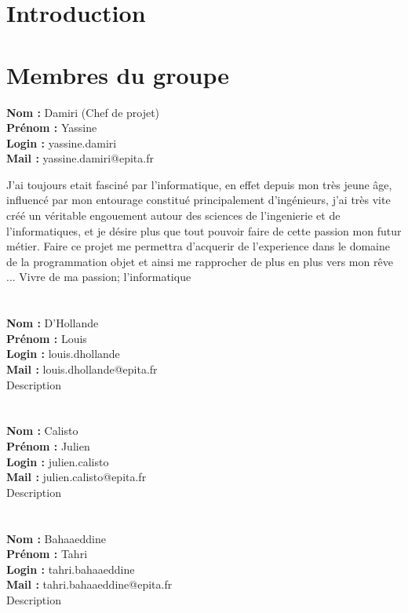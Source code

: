 \documentclass[12pt]{report}
\title{\HUGE{Cahier des charges}}
\author{- \textbf{\textit{\textwidth{Torideani}}} - 
\\ \textit{by} \\ \textit{The Smashing IT} \\ \begin{center}\texttt{[image: logo.png]} \end{center}  \\ 
\\ Yassine Damiri \\ Louis D'Hollande \\ Julien Calisto \\
 Tahri Bahaaeddine }
\begin{document}
    \maketitle
    
    \tableofcontents
    
    \chapter{Introduction}

    \chapter{Membres du groupe}
    \noindent
        \textbf{Nom :} Damiri (Chef de projet)\\
        \textbf{Prénom :} Yassine\\
        \textbf{Login :} yassine.damiri\\
        \textbf{Mail :} yassine.damiri@epita.fr\\
        \par J'ai toujours etait fasciné par l'informatique, en effet depuis mon très jeune âge, influencé par mon entourage constitué principalement d’ingénieurs, j’ai très vite créé un véritable engouement autour des sciences de l’ingenierie et de l’informatiques, et je désire plus que tout pouvoir faire de cette passion mon futur métier. Faire ce projet me permettra d'acquerir de l'experience dans le domaine de la programmation objet et ainsi me rapprocher de plus en plus vers mon rêve ... Vivre de ma passion; l'informatique \smiley{}  \\ \\ \\ 
        \textbf{Nom :} D'Hollande\\
        \textbf{Prénom :} Louis\\
        \textbf{Login :} louis.dhollande\\
        \textbf{Mail :} louis.dhollande@epita.fr\\
        Description \\ \\ \\
        \textbf{Nom :} Calisto\\
        \textbf{Prénom :} Julien\\
        \textbf{Login :} julien.calisto\\
        \textbf{Mail :} julien.calisto@epita.fr\\
        Description \\ \\ \\
        \textbf{Nom :} Bahaaeddine\\
        \textbf{Prénom :} Tahri\\
        \textbf{Login :} tahri.bahaaeddine\\
        \textbf{Mail :} tahri.bahaaeddine@epita.fr\\
        Description \\ \\
\end{document}
